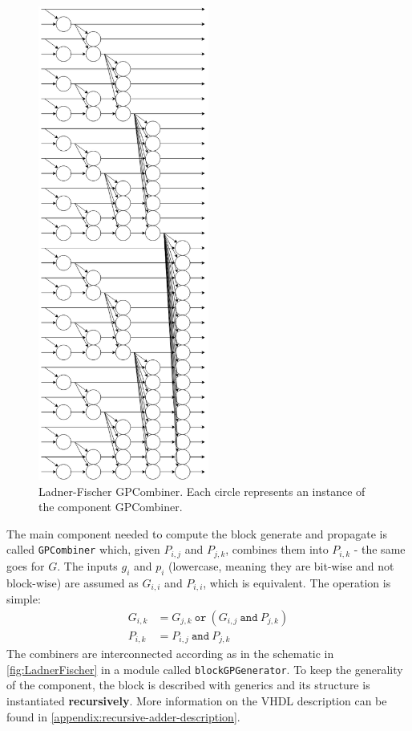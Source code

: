 \begin{enumerate}
    \begin{figure}[htbp]
        \center
    	\includegraphics[width=0.5\textwidth]{./2-implementation/images/LadnerFischer.png}
    	\caption{Ladner-Fischer GPCombiner. Each circle represents an instance of the component GPCombiner.}
    	\label{fig:LadnerFischer}
    \end{figure}
    The main component needed to compute the block generate and propagate is called \texttt{GPCombiner} which, given
    $P_{i, j}$ and $P_{j, k}$, combines them into $P_{i, k}$ - the same goes for $G$. The inputs $g_i$ and $p_i$
    (lowercase, meaning they are bit-wise and not block-wise) are assumed as $G_{i, i}$
    and $P_{i, i}$, which is equivalent. The operation is simple:
    \begin{align*}
        G_{i, k} &= G_{j, k}\ \texttt{or}\  \left( G_{i, j}\ \texttt{and}\ P_{j, k} \right) \\
        P_{i, k} &= P_{i, j}\ \texttt{and}\ P_{j, k}
    \end{align*}
    The combiners are interconnected according as in the schematic in \autoref{fig:LadnerFischer} in a module
    called \texttt{blockGPGenerator}. To keep the generality of the component, the block is described with generics
    and its structure is instantiated \textbf{recursively}. More information on the VHDL description can be found in
    \autoref{appendix:recursive-adder-description}.


\end{enumerate}
